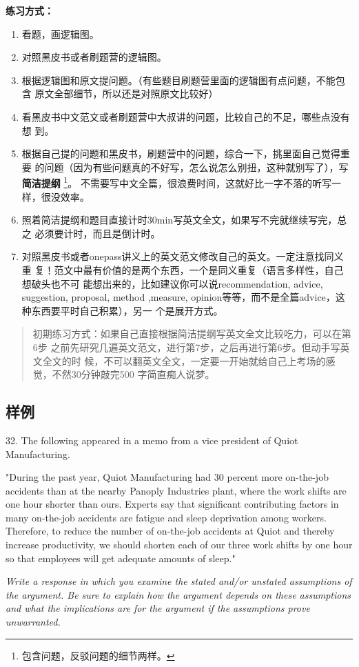 \documentclass[cn,plain]{elegantbookex}
\begin{document}
\textbf{练习方式：}
\begin{enumerate}
    \item 看题，画逻辑图。
    \item 对照黑皮书或者刷题营的逻辑图。
    \item 根据逻辑图和原文提问题。（有些题目刷题营里面的逻辑图有点问题，不能包含
    原文全部细节，所以还是对照原文比较好）
    \item 看黑皮书中文范文或者刷题营中大叔讲的问题，比较自己的不足，哪些点没有想
    到。
    \item 根据自己提的问题和黑皮书，刷题营中的问题，综合一下，挑里面自己觉得重要
    的问题（因为有些问题真的不好写，怎么说怎么别扭，这种就别写了），写\textbf{简洁提纲}
    \footnote{包含问题，反驳问题的细节两样。}。
    不需要写中文全篇，很浪费时间，这就好比一字不落的听写一样，很没效率。
    \item 照着简洁提纲和题目直接计时30min写英文全文，如果写不完就继续写完，总之
    必须要计时，而且是倒计时。
    \item 对照黑皮书或者onepass讲义上的英文范文修改自己的英文。一定注意找同义重
    复！范文中最有价值的是两个东西，一个是同义重复（语言多样性，自己想破头也不可
    能想出来的，比如建议你可以说recommendation, advice, suggestion,
    proposal, method ,measure,
    opinion等等，而不是全篇advice，这种东西要平时自己积累），另一
    个是展开方式。
\end{enumerate}

\begin{quotation}
初期练习方式：如果自己直接根据简洁提纲写英文全文比较吃力，可以在第6步
之前先研究几遍英文范文，进行第7步，之后再进行第6步。但动手写英文全文的时
候，不可以翻英文全文，一定要一开始就给自己上考场的感觉，不然30分钟敲完500
字简直痴人说梦。
\end{quotation}


\subsection{样例}
\begin{tcolorbox}
32. The following appeared in a memo from a vice president of Quiot
Manufacturing.

"During the past year, Quiot Manufacturing had 30 percent more
on-the-job accidents than at the nearby Panoply Industries plant, where
the work shifts are one hour shorter than ours. Experts say that
significant contributing factors in many on-the-job accidents are
fatigue and sleep deprivation among workers. Therefore, to reduce the
number of on-the-job accidents at Quiot and thereby increase
productivity, we should shorten each of our three work shifts by one
hour so that employees will get adequate amounts of sleep."

\emph{Write a response in which you examine the stated and/or unstated
assumptions of the argument. Be sure to explain how the argument depends
on these assumptions and what the implications are for the argument if
the assumptions prove unwarranted.}
\end{tcolorbox}
\end{document}
